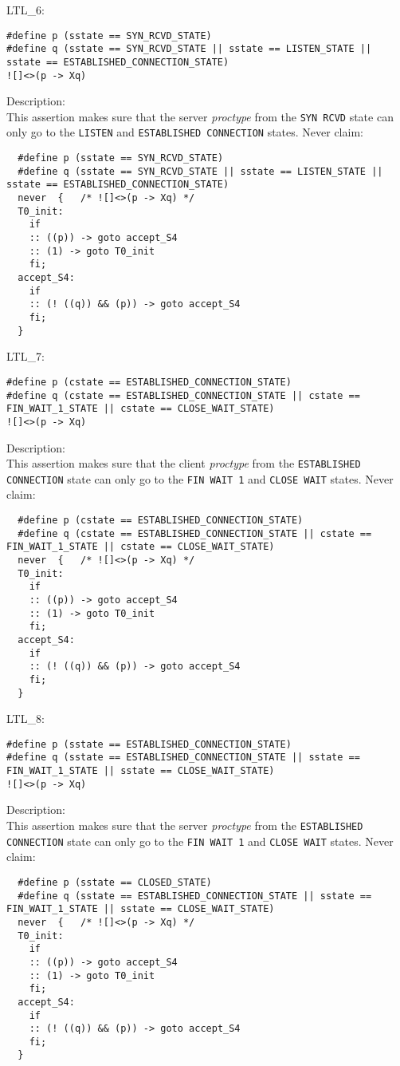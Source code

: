 \documentclass{WigReport}
\begin{document}
LTL\_6:\\
\begin{lstlisting}
#define p (sstate == SYN_RCVD_STATE)
#define q (sstate == SYN_RCVD_STATE || sstate == LISTEN_STATE || sstate == ESTABLISHED_CONNECTION_STATE)
![]<>(p -> Xq)
\end{lstlisting}
Description:\\
This assertion makes sure that the server \textit{proctype} from the \verb|SYN RCVD| state can only go to the \verb|LISTEN| and \verb|ESTABLISHED CONNECTION| states.
Never claim:\\
\begin{lstlisting}
  #define p (sstate == SYN_RCVD_STATE)
  #define q (sstate == SYN_RCVD_STATE || sstate == LISTEN_STATE || sstate == ESTABLISHED_CONNECTION_STATE)
  never  {   /* ![]<>(p -> Xq) */
  T0_init:
    if
    :: ((p)) -> goto accept_S4
    :: (1) -> goto T0_init
    fi;
  accept_S4:
    if
    :: (! ((q)) && (p)) -> goto accept_S4
    fi;
  }
\end{lstlisting}


LTL\_7:\\
\begin{lstlisting}
#define p (cstate == ESTABLISHED_CONNECTION_STATE)
#define q (cstate == ESTABLISHED_CONNECTION_STATE || cstate == FIN_WAIT_1_STATE || cstate == CLOSE_WAIT_STATE)
![]<>(p -> Xq)
\end{lstlisting}
Description:\\
This assertion makes sure that the client \textit{proctype} from the
\verb|ESTABLISHED CONNECTION| state can only go to the \verb|FIN WAIT 1| and
\verb|CLOSE WAIT| states.
Never claim:\\
\begin{lstlisting}
  #define p (cstate == ESTABLISHED_CONNECTION_STATE)
  #define q (cstate == ESTABLISHED_CONNECTION_STATE || cstate == FIN_WAIT_1_STATE || cstate == CLOSE_WAIT_STATE)
  never  {   /* ![]<>(p -> Xq) */
  T0_init:
    if
    :: ((p)) -> goto accept_S4
    :: (1) -> goto T0_init
    fi;
  accept_S4:
    if
    :: (! ((q)) && (p)) -> goto accept_S4
    fi;
  }
\end{lstlisting}


LTL\_8:\\
\begin{lstlisting}
#define p (sstate == ESTABLISHED_CONNECTION_STATE)
#define q (sstate == ESTABLISHED_CONNECTION_STATE || sstate == FIN_WAIT_1_STATE || sstate == CLOSE_WAIT_STATE)
![]<>(p -> Xq)
\end{lstlisting}
Description:\\
This assertion makes sure that the server \textit{proctype} from the
\verb|ESTABLISHED CONNECTION| state can only go to the \verb|FIN WAIT 1| and
\verb|CLOSE WAIT| states.
Never claim:\\
\begin{lstlisting}
  #define p (sstate == CLOSED_STATE)
  #define q (sstate == ESTABLISHED_CONNECTION_STATE || sstate == FIN_WAIT_1_STATE || sstate == CLOSE_WAIT_STATE)
  never  {   /* ![]<>(p -> Xq) */
  T0_init:
    if
    :: ((p)) -> goto accept_S4
    :: (1) -> goto T0_init
    fi;
  accept_S4:
    if
    :: (! ((q)) && (p)) -> goto accept_S4
    fi;
  }
\end{lstlisting}
\end{document}
